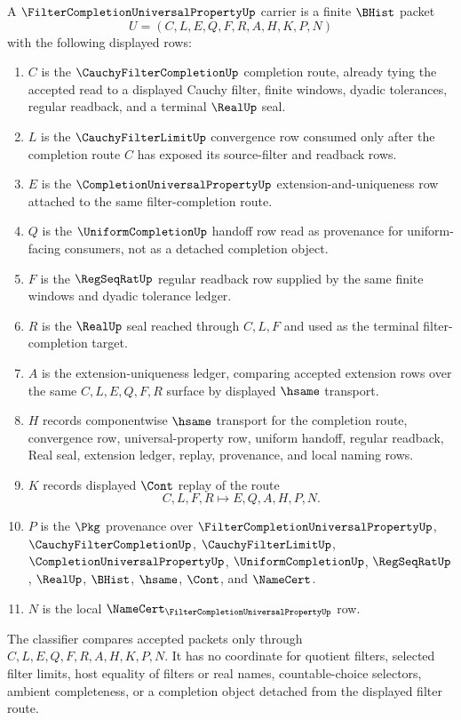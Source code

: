\begin{definition}
\label{def:filter-completion-universal-property-carrier}
A $\FilterCompletionUniversalPropertyUp$ carrier is a finite $\BHist$ packet
$$
U=(C,L,E,Q,F,R,A,H,K,P,N)
$$
with the following displayed rows:
\begin{enumerate}
\item $C$ is the $\CauchyFilterCompletionUp$ completion route, already tying the accepted read to a displayed Cauchy filter, finite windows, dyadic tolerances, regular readback, and a terminal $\RealUp$ seal.
\item $L$ is the $\CauchyFilterLimitUp$ convergence row consumed only after the completion route $C$ has exposed its source-filter and readback rows.
\item $E$ is the $\CompletionUniversalPropertyUp$ extension-and-uniqueness row attached to the same filter-completion route.
\item $Q$ is the $\UniformCompletionUp$ handoff row read as provenance for uniform-facing consumers, not as a detached completion object.
\item $F$ is the $\RegSeqRatUp$ regular readback row supplied by the same finite windows and dyadic tolerance ledger.
\item $R$ is the $\RealUp$ seal reached through $C,L,F$ and used as the terminal filter-completion target.
\item $A$ is the extension-uniqueness ledger, comparing accepted extension rows over the same $C,L,E,Q,F,R$ surface by displayed $\hsame$ transport.
\item $H$ records componentwise $\hsame$ transport for the completion route, convergence row, universal-property row, uniform handoff, regular readback, Real seal, extension ledger, replay, provenance, and local naming rows.
\item $K$ records displayed $\Cont$ replay of the route
$$
C,L,F,R \longmapsto E,Q,A,H,P,N .
$$
\item $P$ is the $\Pkg$ provenance over $\FilterCompletionUniversalPropertyUp$, $\CauchyFilterCompletionUp$, $\CauchyFilterLimitUp$, $\CompletionUniversalPropertyUp$, $\UniformCompletionUp$, $\RegSeqRatUp$, $\RealUp$, $\BHist$, $\hsame$, $\Cont$, and $\NameCert$.
\item $N$ is the local $\NameCert_{\FilterCompletionUniversalPropertyUp}$ row.
\end{enumerate}
The classifier compares accepted packets only through $C,L,E,Q,F,R,A,H,K,P,N$. It has no coordinate for quotient filters, selected filter limits, host equality of filters or real names, countable-choice selectors, ambient completeness, or a completion object detached from the displayed filter route.
\end{definition}

